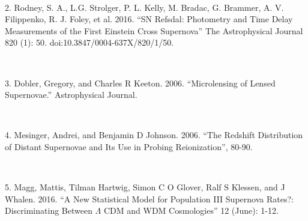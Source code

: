 \

2. Rodney, S. A., L.G. Strolger, P. L. Kelly, M. Bradac, G. Brammer, A. V. Filippenko, R. J. Foley, et al. 2016. ``SN Refsdal: Photometry and Time Delay Measurements of the First Einstein Cross Supernova'' The Astrophysical Journal 820 (1): 50. doi:10.3847/0004-637X/820/1/50.

\

3. Dobler, Gregory, and Charles R Keeton. 2006. ``Microlensing of Lensed Supernovae.'' Astrophysical Journal.

\

4. Mesinger, Andrei, and Benjamin D Johnson. 2006. ``The Redshift Distribution of Distant Supernovae and Its Use in Probing Reionization'', 80-90.

\

5. Magg, Mattis, Tilman Hartwig, Simon C O Glover, Ralf S Klessen, and J Whalen. 2016. ``A New Statistical Model for Population III Supernova Rates?: Discriminating Between $\Lambda$ CDM and WDM Cosmologies'' 12 (June): 1-12.












